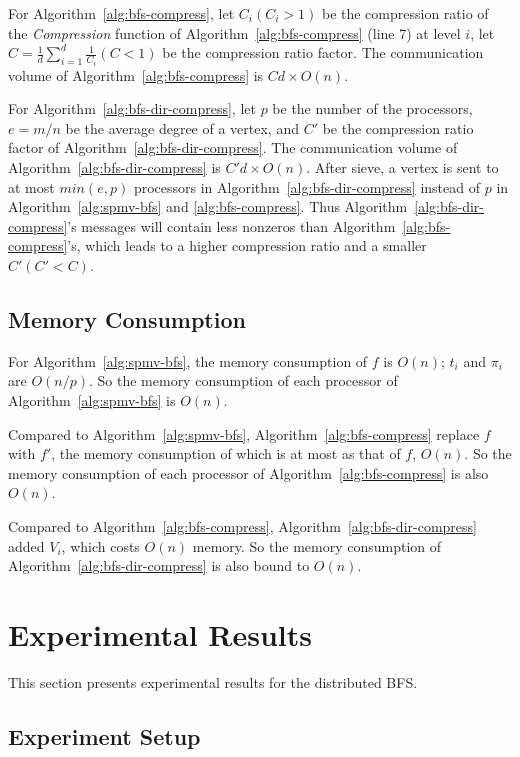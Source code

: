 \documentclass[conference]{IEEEtran}
\begin{document}
For Algorithm~\ref{alg:bfs-compress}, let $C_i(C_i>1)$ be the compression
ratio of the \textit{Compression} function of Algorithm~\ref{alg:bfs-compress}
(line 7) at level $i$, let $C=\frac{1}{d}\sum_{i=1}^{d} \frac{1}{C_i}(C<1)$ be
the compression ratio factor.  The communication volume of
Algorithm~\ref{alg:bfs-compress} is $Cd \times O(n)$.

For Algorithm~\ref{alg:bfs-dir-compress}, let $p$ be the number of the
processors, $e=m/n$ be the average degree of a vertex, and $C'$ be the
compression ratio factor of Algorithm~\ref{alg:bfs-dir-compress}. The
communication volume of Algorithm~\ref{alg:bfs-dir-compress} is $C'd \times
O(n)$. After sieve, a vertex is sent to at most $min(e,p)$ processors in
Algorithm~\ref{alg:bfs-dir-compress} instead of $p$ in
Algorithm~\ref{alg:spmv-bfs} and \ref{alg:bfs-compress}.  Thus
Algorithm~\ref{alg:bfs-dir-compress}'s messages will contain less nonzeros
than Algorithm~\ref{alg:bfs-compress}'s, which leads to a higher compression
ratio and a smaller $C'(C' < C)$.

\subsection{Memory Consumption}

For Algorithm~\ref{alg:spmv-bfs}, the memory consumption of $f$ is $O(n)$;
$t_i$ and $\pi_i$ are $O(n/p)$. So the memory consumption of each processor of
Algorithm~\ref{alg:spmv-bfs} is $O(n)$.

Compared to Algorithm~\ref{alg:spmv-bfs}, Algorithm~\ref{alg:bfs-compress}
replace $f$ with $f'$, the memory consumption of which is at most as
that of $f$, $O(n)$.  So the memory consumption of each processor of
Algorithm~\ref{alg:bfs-compress} is also $O(n)$.

Compared to Algorithm~\ref{alg:bfs-compress},
Algorithm~\ref{alg:bfs-dir-compress} added $V_i$, which costs $O(n)$ memory.
So the memory consumption of Algorithm~\ref{alg:bfs-dir-compress} is also
bound to $O(n)$.



\section{Experimental Results}
\label{sec:exp}

This section presents experimental results for the distributed BFS. 

\subsection{Experiment Setup}
\end{document}
